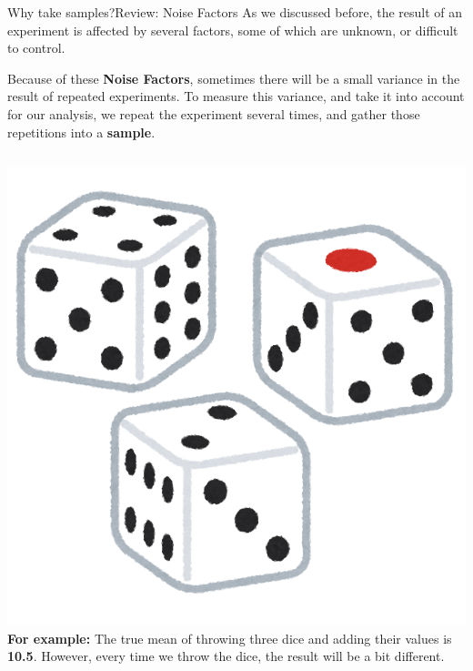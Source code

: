 \begin{frame}{Why take samples?}{Review: Noise Factors}
  As we discussed before, the result of an experiment is affected by several factors, some of which are unknown, or difficult to control.\bigskip

  Because of these {\bf Noise Factors}, sometimes there will be a small variance in the result of repeated experiments. To measure this variance, and take it into account for our analysis, we repeat the experiment several times, and gather those repetitions into a {\bf sample}.\bigskip


  \begin{columns}
      \includegraphics[width=\textwidth]{../img/irasutoya_dice}
      {\bf For example:} The true mean of throwing three dice and adding their values is {\bf 10.5}. However, every time we throw the dice, the result will be a bit different.
  \end{columns}
\end{frame}

